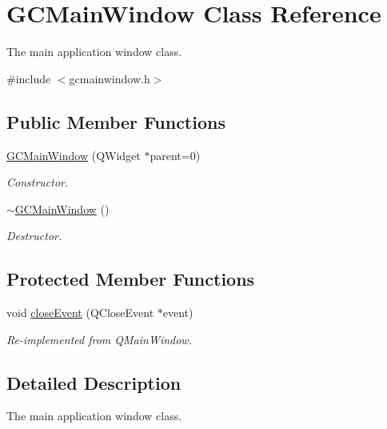 \hypertarget{class_g_c_main_window}{\section{\-G\-C\-Main\-Window \-Class \-Reference}
\label{class_g_c_main_window}
}


\-The main application window class.  




{\ttfamily \#include $<$gcmainwindow.\-h$>$}

\subsection*{\-Public \-Member \-Functions}
\begin{DoxyCompactItemize}
\item 
\hyperlink{class_g_c_main_window_ab20de5f22439fbb8baf7d6b4be2ef63e}{\-G\-C\-Main\-Window} (\-Q\-Widget $\ast$parent=0)
\begin{DoxyCompactList}\small\item\em \-Constructor. \end{DoxyCompactList}\item 
\hyperlink{class_g_c_main_window_a1b9394727a4790a926fae15973f9e629}{$\sim$\-G\-C\-Main\-Window} ()
\begin{DoxyCompactList}\small\item\em \-Destructor. \end{DoxyCompactList}\end{DoxyCompactItemize}
\subsection*{\-Protected \-Member \-Functions}
\begin{DoxyCompactItemize}
\item 
void \hyperlink{class_g_c_main_window_a08995f775bad0ea2ff98965ede9c2967}{close\-Event} (\-Q\-Close\-Event $\ast$event)
\begin{DoxyCompactList}\small\item\em \-Re-\/implemented from \-Q\-Main\-Window. \end{DoxyCompactList}\end{DoxyCompactItemize}


\subsection{\-Detailed \-Description}
\-The main application window class. 

